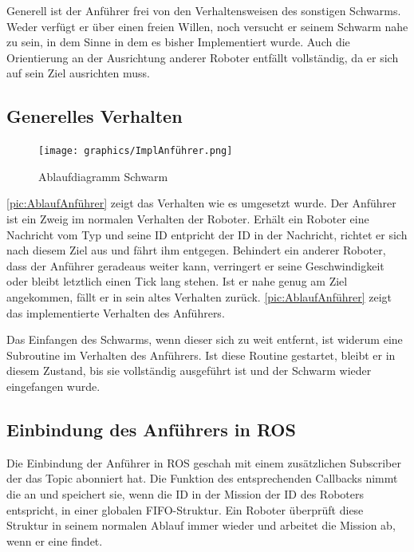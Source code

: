 Generell ist der Anführer frei von den Verhaltensweisen des sonstigen Schwarms. Weder verfügt er über einen freien Willen, noch versucht er seinem Schwarm nahe zu sein, in dem Sinne in dem es bisher Implementiert wurde. Auch die Orientierung an der Ausrichtung anderer Roboter entfällt vollständig, da er sich auf sein Ziel ausrichten muss.

\newpage\subsection*{Generelles Verhalten}

\begin{figure}
	\texttt{[image: graphics/ImplAnführer.png]}
	\caption{Ablaufdiagramm Schwarm}
	\label{pic:AblaufAnführer}
\end{figure}

\autoref{pic:AblaufAnführer} zeigt das Verhalten wie es umgesetzt wurde.
Der Anführer ist ein Zweig im normalen Verhalten der Roboter. Erhält ein Roboter eine Nachricht vom Typ  und seine ID entpricht der ID in der Nachricht, richtet er sich nach diesem Ziel aus und fährt ihm entgegen. Behindert ein anderer Roboter, dass der Anführer geradeaus weiter kann, verringert er seine Geschwindigkeit oder bleibt letztlich einen Tick lang stehen. Ist er nahe genug am Ziel angekommen, fällt er in sein altes Verhalten zurück. \autoref{pic:AblaufAnführer} zeigt das implementierte Verhalten des Anführers.

Das Einfangen des Schwarms, wenn dieser sich zu weit entfernt, ist widerum eine Subroutine im Verhalten des Anführers. Ist diese Routine gestartet, bleibt er in diesem Zustand, bis sie vollständig ausgeführt ist und der Schwarm wieder eingefangen wurde.

\subsection*{Einbindung des Anführers in ROS}

Die Einbindung der Anführer in \ac{ROS} geschah mit einem zusätzlichen Subscriber der das Topic  abonniert hat. Die Funktion des entsprechenden Callbacks nimmt die  an und speichert sie, wenn die ID in der Mission der ID des Roboters entspricht, in einer globalen FIFO-Struktur. Ein Roboter überprüft diese Struktur in seinem normalen Ablauf immer wieder und arbeitet die Mission ab, wenn er eine findet.

